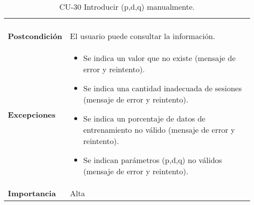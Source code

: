 \begin{table}[p]
\begin{tabularx}{\linewidth}{ p{} p{} }
\begin{enumerate}
		\end{enumerate}\\
		\textbf{Postcondición}        & El usuario puede consultar la información. \\
		\textbf{Excepciones}          & 
		\begin{itemize}
			\tightlist
			\item Se indica un valor que no existe (mensaje de error y reintento).
			\item Se indica una cantidad inadecuada de sesiones (mensaje de error y reintento).
			\item Se indica un porcentaje de datos de entrenamiento no válido (mensaje de error y reintento).
			\item Se indican parámetros (p,d,q) no válidos (mensaje de error y reintento).
		\end{itemize} \\
		\textbf{Importancia}          & Alta \\
		\bottomrule
	\end{tabularx}
	\caption{CU-30 Introducir (p,d,q) manualmente.}
\end{table}



